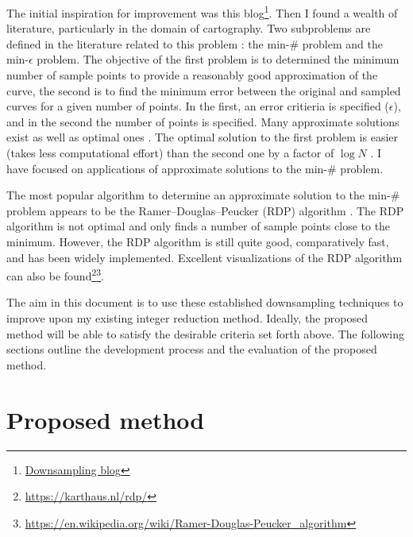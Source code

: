 \documentclass[a4paper,11pt]{article}
\begin{document}
The initial inspiration for improvement was this blog\footnote{\label{fn:blog}\href{https://kaushikghose.wordpress.com/2017/11/25/adaptively-downsampling-a-curve/}{Downsampling blog}}.
Then I found a wealth of literature, particularly in the domain of cartography.
Two subproblems are defined in the literature related to this problem \citep{ImaiPolygonalApproximationsCurve1988}: the min-\# problem and the min-$\epsilon$ problem.
The objective of the first problem is to determined the minimum number of sample points to provide a reasonably good approximation of the curve, the second is to find the minimum error between the original and sampled curves for a given number of points.
In the first, an error critieria is specified ($\epsilon$), and in the second the number of points is specified.
Many approximate solutions exist \citep{Rameriterativeprocedurepolygonal1972,DouglasAlgorithmsreductionnumber1973,HeckbertSurveyPolygonalSurface1997} as well as optimal ones \citep{ImaiPolygonalApproximationsCurve1988,PerezOptimumpolygonalapproximation1994,ChanApproximationPolygonalCurves1996}.
The optimal solution to the first problem is easier (takes less computational effort) than the second one by a factor of $\log N$ \citep{ChanApproximationPolygonalCurves1996}.
I have focused on applications of approximate solutions to the min-\# problem.

The most popular algorithm to determine an approximate solution to the min-\# problem appears to be the Ramer–Douglas–Peucker (RDP) algorithm \citep{Rameriterativeprocedurepolygonal1972,DouglasAlgorithmsreductionnumber1973,HeckbertSurveyPolygonalSurface1997}.
The RDP algorithm is not optimal and only finds a number of sample points close to the minimum.
However, the RDP algorithm is still quite good, comparatively fast, and has been widely implemented.
Excellent visualizations of the RDP algorithm can also be found\footnote{\url{https://karthaus.nl/rdp/}}\footnote{\url{https://en.wikipedia.org/wiki/Ramer-Douglas-Peucker_algorithm}}.

The aim in this document is to use these established downsampling techniques to improve upon my existing integer reduction method.
Ideally, the proposed method will be able to satisfy the desirable criteria set forth above.
The following sections outline the development process and the evaluation of the proposed method.

\section{Proposed method}
\end{document}
